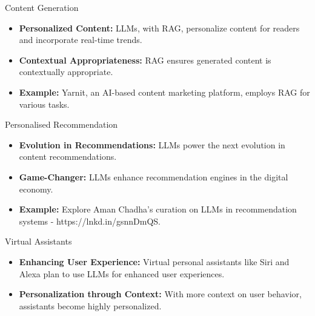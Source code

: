 \begin{frame}[fragile]{Content Generation}

\begin{itemize}
  \item \textbf{Personalized Content:} LLMs, with RAG, personalize content for readers and incorporate real-time trends.
  
  \item \textbf{Contextual Appropriateness:} RAG ensures generated content is contextually appropriate.
  
  \item \textbf{Example:} Yarnit, an AI-based content marketing platform, employs RAG for various tasks.
\end{itemize}

\end{frame}

\begin{frame}[fragile]{Personalised Recommendation}

\begin{itemize}
  \item \textbf{Evolution in Recommendations:} LLMs power the next evolution in content recommendations.
  
  \item \textbf{Game-Changer:} LLMs enhance recommendation engines in the digital economy.
  
  \item \textbf{Example:} Explore Aman Chadha's curation on LLMs in recommendation systems - https://lnkd.in/gsnnDmQS.
\end{itemize}

\end{frame}

\begin{frame}[fragile]{Virtual Assistants}

\begin{itemize}
  \item \textbf{Enhancing User Experience:} Virtual personal assistants like Siri and Alexa plan to use LLMs for enhanced user experiences.
  
  \item \textbf{Personalization through Context:} With more context on user behavior, assistants become highly personalized.
\end{itemize}

\end{frame}

